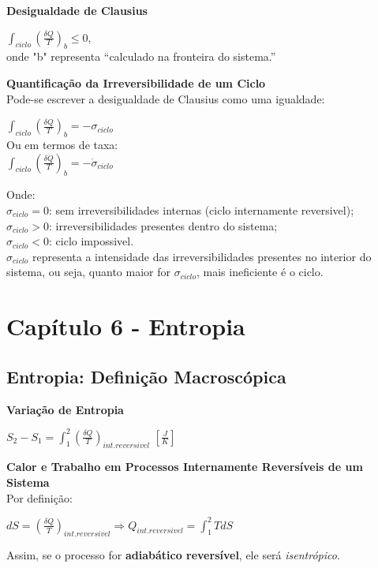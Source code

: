 \documentclass[a4paper, 12pt]{article}
\begin{document}
\textbf{Desigualdade de Clausius}
	\begin{center}
		\large
		$ \int_{ciclo} (\frac{\delta Q}{T})_b \leq 0$,\\ onde "b"  representa “calculado na fronteira do
		sistema.”
	\end{center}
	
\textbf{Quantificação da Irreversibilidade de um Ciclo}\\
Pode-se escrever a desigualdade de Clausius como uma igualdade:
	\begin{center}
		\large
		$ \int_{ciclo} (\frac{\delta Q}{T})_b = -\sigma_{ciclo}$\\
		Ou em termos de taxa:\\
		$ \int_{ciclo} (\frac{\delta \dot{Q}}{T})_b = -\dot{\sigma}_{ciclo}$
	\end{center}
	Onde:\\
	$ \sigma_{ciclo} = 0 $: sem irreversibilidades internas (ciclo internamente reversivel);\\
	$ \sigma_{ciclo} > 0 $: irreversibilidades presentes dentro do sistema;	\\
	$ \sigma_{ciclo} < 0 $: ciclo impossivel.\\
	
	$ \sigma_{ciclo} $ representa a intensidade das irreversibilidades presentes no interior do sistema,	ou seja, quanto maior for $ \sigma_{ciclo} $, mais ineficiente é o ciclo.
	

\newpage
\section{Capítulo 6 - Entropia}
\subsection{Entropia: Definição Macroscópica}
\textbf{Variação de Entropia}
	\begin{center}
		\large
		$ S_2 - S_1 = \int_{1}^2 (\frac{\delta Q}{T})_{int. reversivel} $  $ [\frac{J}{K}] $ 
	\end{center}

\textbf{Calor e Trabalho em Processos Internamente
	Reversíveis de um Sistema}\\

Por definição:
	\begin{center}
		\large
		$ dS = (\frac{\delta Q}{T})_{int. reversivel} \Rightarrow
		Q_{int.reversivel} = \int^2_{1}TdS $
	\end{center}
Assim, se o processo for \textbf{adiabático reversível}, ele será \textit{isentrópico}.
\end{document}

